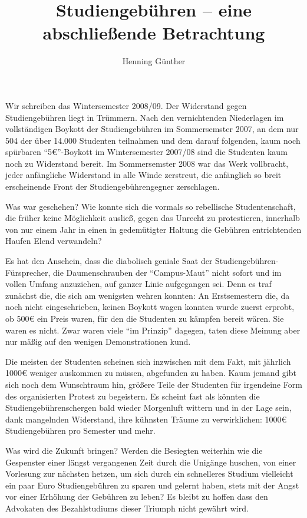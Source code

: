 \documentclass{article}
\title{Studiengebühren -- eine abschließende Betrachtung}
\author{Henning Günther}
\date{}
\begin{document}
\maketitle

Wir schreiben das Wintersemester 2008/09.
Der Widerstand gegen Studiengebühren liegt in Trümmern.
Nach den vernichtenden Niederlagen im voll\-stän\-di\-gen Boykott der Studiengebühren im Sommersemster 2007, an dem nur 504 der über 14.000 Studenten teilnahmen und dem darauf folgenden, kaum noch spürbaren "`5€"'-Boykott im Wintersemester 2007/08 sind die Studenten kaum noch zu Widerstand bereit.
Im Sommersemster 2008 war das Werk vollbracht, jeder anfängliche Widerstand in alle Winde zerstreut, die anfänglich so breit erscheinende Front der Studiengebührengegner zerschlagen.

Was war geschehen?
Wie konnte sich die vormals so rebellische Studentenschaft, die früher keine Möglichkeit ausließ, gegen das Unrecht zu protestieren, innerhalb von nur einem Jahr in einen in gedemütigter Haltung die Gebühren entrichtenden Haufen Elend verwandeln?

Es hat den Anschein, dass die diabolisch geniale Saat der Studiengebühren-Fürsprecher, die Daumenschrauben der "`Campus-Maut"' nicht sofort und im vollen Umfang anzuziehen, auf ganzer Linie aufgegangen sei.
Denn es traf zunächst die, die sich am wenigsten wehren konnten:
An Erstsemestern die, da noch nicht eingeschrieben, keinen Boykott wagen konnten wurde zuerst erprobt, ob 500€ ein Preis waren, für den die Studenten zu kämpfen bereit wären.
Sie waren es nicht.
Zwar waren viele "`im Prinzip"' dagegen, taten diese Meinung aber nur mäßig auf den wenigen Demonstrationen kund.

Die meisten der Studenten scheinen sich inzwischen mit dem Fakt, mit jährlich 1000€ weniger auskommen zu müssen, abgefunden zu haben.
Kaum jemand gibt sich noch dem Wunschtraum hin, größere Teile der Studenten für irgendeine Form des organisierten Protest zu begeistern.
Es scheint fast als könnten die Studiengebührenschergen bald wieder Morgenluft wittern und in der Lage sein, dank mangelnden Widerstand, ihre kühnsten Träume zu verwirklichen: 1000€ Studiengebühren pro Semester und mehr.

Was wird die Zukunft bringen?
Werden die Besiegten weiterhin wie die Gespenster einer längst vergangenen Zeit durch die Unigänge huschen, von einer Vorlesung zur nächsten hetzen, um sich durch ein schnelleres Studium vielleicht ein paar Euro Studiengebühren zu sparen und gelernt haben, stets mit der Angst vor einer Erhöhung der Gebühren zu leben?
Es bleibt zu hoffen dass den Advokaten des Bezahlstudiums dieser Triumph nicht gewährt wird.
\end{document}
